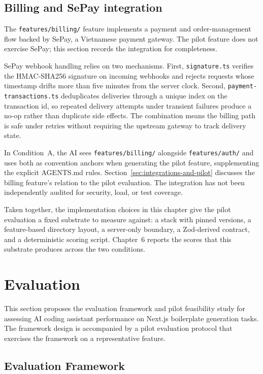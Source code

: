 \documentclass[12pt,a4paper]{report}
\DeclareRobustCommand{\filename}[1]{\bgroup\urlstyle{tt}\nolinkurl{#1}\egroup}
\begin{document}
\section{Billing and SePay integration}
\label{sec:billing-sepay}

The \filename{features/billing/} feature implements a payment and order-management flow backed by SePay, a Vietnamese payment gateway. The pilot feature does not exercise SePay; this section records the integration for completeness.

SePay webhook handling relies on two mechanisms. First, \filename{signature.ts} verifies the HMAC-SHA256 signature on incoming webhooks and rejects requests whose timestamp drifts more than five minutes from the server clock. Second, \filename{payment-transactions.ts} deduplicates deliveries through a unique index on the transaction id, so repeated delivery attempts under transient failures produce a no-op rather than duplicate side effects. The combination means the billing path is safe under retries without requiring the upstream gateway to track delivery state.

In Condition~A, the AI sees \filename{features/billing/} alongside \filename{features/auth/} and uses both as convention anchors when generating the pilot feature, supplementing the explicit AGENTS.md rules. Section~\ref{sec:integrations-and-pilot} discusses the billing feature's relation to the pilot evaluation. The integration has not been independently audited for security, load, or test coverage.

Taken together, the implementation choices in this chapter give the pilot evaluation a fixed substrate to measure against: a stack with pinned versions, a feature-based directory layout, a server-only boundary, a Zod-derived contract, and a deterministic scoring script. Chapter~6 reports the scores that this substrate produces across the two conditions.

\chapter{Evaluation}
\label{sec:evaluation}

This section proposes the evaluation framework and pilot feasibility study for assessing AI coding assistant performance on Next.js boilerplate generation tasks. The framework design is accompanied by a pilot evaluation protocol that exercises the framework on a representative feature.

\section{Evaluation Framework}
\label{sec:evaluation-framework}
\end{document}
